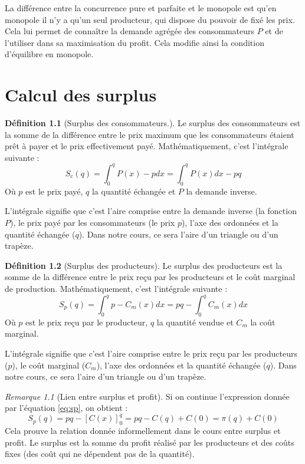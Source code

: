 \documentclass[
]{book}
\theoremstyle{definition}
\newtheorem{definition}{Définition}[chapter]
\theoremstyle{definition}
\theoremstyle{definition}
\theoremstyle{definition}
\theoremstyle{remark}
\newtheorem*{remark}{Remarque}
\begin{document}
La différence entre la concurrence pure et parfaite et le monopole est qu'en monopole il n'y a qu'un seul producteur, qui dispose du pouvoir de fixé les prix.
Cela lui permet de connaître la demande agrégée des consommateurs \(P\) et de l'utiliser dans sa maximisation du profit.
Cela modifie ainsi la condition d'équilibre en monopole.

\hypertarget{calcul-des-surplus}{%
\chapter{Calcul des surplus}\label{calcul-des-surplus}}

\begin{definition}[Surplus des consommateurs.]
Le surplus des consommateurs est la somme de la différence entre le prix maximum que les consommateurs étaient prêt à payer et le prix effectivement payé.
Mathématiquement, c'est l'intégrale suivante :
\[
S_c(q)=\int_0^qP(x)-pdx=\int_0^qP(x)dx-pq
\]
Où \(p\) est le prix payé, \(q\) la quantité échangée et \(P\) la demande inverse.
\end{definition}

L'intégrale signifie que c'est l'aire comprise entre la demande inverse (la fonction \(P\)), le prix payé par les consommateurs (le prix \(p\)), l'axe des ordonnées et la quantité échangée (\(q\)).
Dans notre cours, ce sera l'aire d'un triangle ou d'un trapèze.

\begin{definition}[Surplus des producteurs]
Le surplus des producteurs est la somme de la différence entre le prix reçu par les producteurs et le coût marginal de production.
Mathématiquement, c'est l'intégrale suivante :
\[
S_p(q)=\int_0^qp-C_m(x)dx=pq-\int_0^qC_m(x)dx \label{eq:sp}
\]
Où \(p\) est le prix reçu par le producteur, \(q\) la quantité vendue et \(C_m\) la coût marginal.
\end{definition}

L'intégrale signifie que c'est l'aire comprise entre le prix reçu par les producteurs (\(p\)), le coût marginal (\(C_m\)), l'axe des ordonnées et la quantité échangée (\(q\)).
Dans notre cours, ce sera l'aire d'un triangle ou d'un trapèze.

\begin{remark}[Lien entre surplus et profit]
Si on continue l'expression donnée par l'équation \eqref{eq:sp}, on obtient :
\[S_p(q)=pq-\left[C(x)\right]_0^q=pq-C(q)+C(0)=\pi(q)+C(0)\]
Cela prouve la relation donnée informellement dans le cours entre surplus et profit.
Le surplus est la somme du profit réalisé par les producteurs et des coûts fixes (des coût qui ne dépendent pas de la quantité).
\end{remark}
\end{document}
